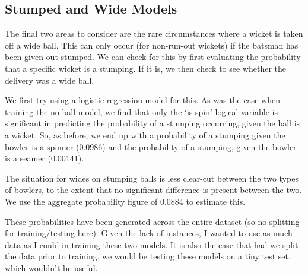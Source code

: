 \newpage
\subsection{Stumped and Wide Models}

The final two areas to consider are the rare circumstances where a wicket is taken off a wide ball. This can only occur (for non-run-out wickets) if the batsman has been given out stumped. We can check for this by first evaluating the probability that a specific wicket is a stumping. If it is, we then check to see whether the delivery was a wide ball.

We first try using a logistic regression model for this. As was the case when training the no-ball model, we find that only the `is spin' logical variable is significant in predicting the probability of a stumping occurring, given the ball is a wicket. So, as before, we end up with a probability of a stumping given the bowler is a spinner (0.0986) and the probability of a stumping, given the bowler is a seamer (0.00141). 

The situation for wides on stumping balls is less clear-cut between the two types of bowlers, to the extent that no significant difference is present between the two. We use the aggregate probability figure of 0.0884 to estimate this.

These probabilities have been generated across the entire dataset (so no splitting for training/testing here). Given the lack of instances, I wanted to use as much data as I could in training these two models. It is also the case that had we split the data prior to training, we would be testing these models on a tiny test set, which wouldn't be useful.